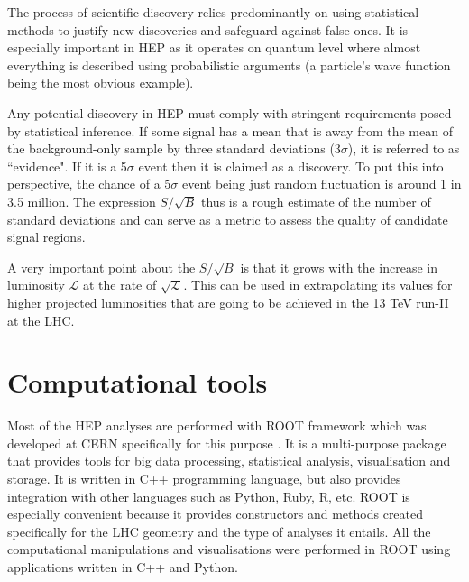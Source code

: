 The process of scientific discovery relies predominantly on using statistical methods to justify new discoveries and safeguard against false ones. It is especially important in HEP as it operates on quantum level where almost everything is described using probabilistic arguments (a particle's wave function being the most obvious example).
  
Any potential discovery in HEP must comply with stringent requirements posed by statistical inference. If some signal has a mean that is away from the mean of the background-only sample by three standard deviations (3$\sigma$), it is referred to as ``evidence". If it is a 5$\sigma$ event then it is claimed as a discovery. To put this into perspective, the chance of a 5$\sigma$ event being just random fluctuation is around 1 in 3.5 million. 
The expression $S/\sqrt{B}$ thus is a rough estimate of the number of standard deviations and can serve as a metric to assess the quality of candidate signal regions. 

A very important point about the $S/\sqrt{B}$ is that it grows with the increase in luminosity $\mathcal{L}$ at the rate of $\sqrt{\mathcal{L}}$. This can be used in extrapolating its values for higher projected luminosities that are going to be achieved in the 13 TeV run-II at the LHC.

\section{Computational tools}
Most of the HEP analyses are performed with ROOT framework which was developed at CERN specifically for this purpose \citep{root}. It is a multi-purpose package that provides tools for big data processing, statistical analysis, visualisation and storage. It is written in C++ programming language, but also provides integration with other languages such as Python, Ruby, R, etc.  ROOT is especially convenient because it provides constructors and methods created specifically for the LHC geometry and the type of analyses it entails. All the computational manipulations and visualisations were performed in ROOT using applications written in C++ and Python. 




 

